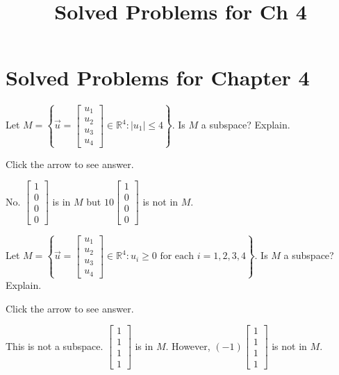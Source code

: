 \documentclass{ximera}
\title{Solved Problems for Ch 4} \license{CC BY-NC-SA 4.0}
\begin{document}
\begin{abstract}
\end{abstract}
\maketitle

\section*{Solved Problems for Chapter 4}

\begin{problem}\label{prb:5.10} Let $M=\left\{ \vec{u}=\left[ \begin{array}{c}
u_{1} \\
u_{2} \\
u_{3} \\
u_{4}
\end{array}\right] \in
\mathbb{R}^{4}:|u_{1}| \leq 4\right\} .$ Is $M$ a
subspace? Explain.

Click the arrow to see answer.  
\begin{expandable}
No. $\left[
\begin{array}{r}
1 \\
0 \\
0 \\
0
\end{array}
\right]$ is in $M$ but $10\left[ \begin{array}{r}
1 \\
0 \\
0 \\
0
\end{array}
\right]$ is not in $M$.
\end{expandable}
\end{problem}

\begin{problem}\label{prb:5.11} Let $M=\left\{ \vec{u}=\left[ \begin{array}{c}
u_{1} \\
u_{2} \\
u_{3} \\
u_{4}
\end{array}\right] \in
\mathbb{R}^{4}:u_{i}\geq 0\text{ for each }i=1,2,3,4\right\} .$ Is $M$ a
subspace? Explain.

Click the arrow to see answer.  
\begin{expandable}
This is not a subspace. $\left[ \begin{array}{r}
1 \\
1 \\
1 \\
1
\end{array}
\right] $
is in $M$. However, $\left( -1\right) \left[
\begin{array}{r}
1 \\
1 \\
1 \\
1
\end{array}
\right] $ is not in $M$.
\end{expandable}
\end{problem}
\end{document}
